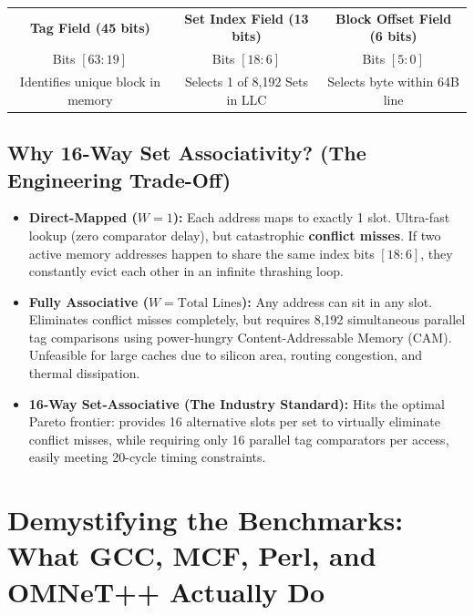\documentclass[11pt, a4paper]{article}
\begin{document}
\begin{center}
\small
\begin{tabular}{|c|c|c|}
\hline
\textbf{Tag Field (45 bits)} & \textbf{Set Index Field (13 bits)} & \textbf{Block Offset Field (6 bits)} \\
Bits $[63 : 19]$ & Bits $[18 : 6]$ & Bits $[5 : 0]$ \\
Identifies unique block in memory & Selects 1 of 8,192 Sets in LLC & Selects byte within 64B line \\
\hline
\end{tabular}
\end{center}

\subsection{Why 16-Way Set Associativity? (The Engineering Trade-Off)}
\begin{itemize}[leftmargin=1.5em]
  \item \textbf{Direct-Mapped ($W=1$):} Each address maps to exactly 1 slot. Ultra-fast lookup (zero comparator delay), but catastrophic \textbf{conflict misses}. If two active memory addresses happen to share the same index bits $[18:6]$, they constantly evict each other in an infinite thrashing loop.
  \item \textbf{Fully Associative ($W = \text{Total Lines}$):} Any address can sit in any slot. Eliminates conflict misses completely, but requires 8,192 simultaneous parallel tag comparisons using power-hungry Content-Addressable Memory (CAM). Unfeasible for large caches due to silicon area, routing congestion, and thermal dissipation.
  \item \textbf{16-Way Set-Associative (The Industry Standard):} Hits the optimal Pareto frontier: provides 16 alternative slots per set to virtually eliminate conflict misses, while requiring only 16 parallel tag comparators per access, easily meeting 20-cycle timing constraints.
\end{itemize}

\newpage

\section{Demystifying the Benchmarks: What GCC, MCF, Perl, and OMNeT++ Actually Do}
\end{document}
